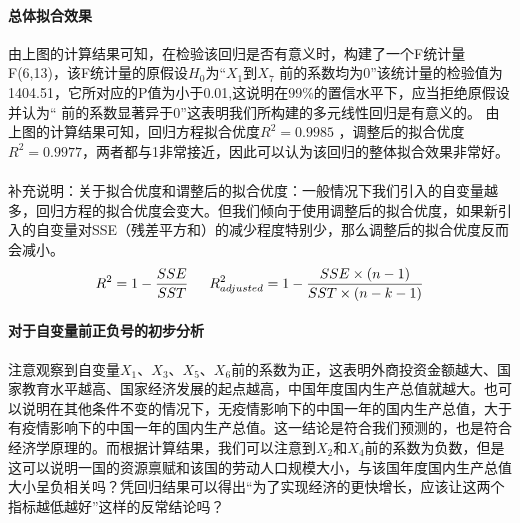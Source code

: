 \documentclass[UTF8]{article}
\begin{document}
	\paragraph{总体拟合效果}由上图的计算结果可知，在检验该回归是否有意义时，构建了一个F统计量F(6,13)，该F统计量的原假设$H_0$为“$X_1$到$X_7$ 前的系数均为0”该统计量的检验值为1404.51，它所对应的P值为小于0.01,这说明在99\%的置信水平下，应当拒绝原假设并认为“ 前的系数显著异于0”这表明我们所构建的多元线性回归是有意义的。
	由上图的计算结果可知，回归方程拟合优度$R^2=0.9985$ ，调整后的拟合优度$R^2=0.9977$，两者都与1非常接近，因此可以认为该回归的整体拟合效果非常好。
	\\
	\\补充说明：关于拟合优度和谓整后的拟合优度：一般情况下我们引入的自变量越多，回归方程的拟合优度会变大。但我们倾向于使用调整后的拟合优度，如果新引入的自变量对SSE（残差平方和）的减少程度特别少，那么调整后的拟合优度反而会减小。
	$$
	R^2=1-\frac{SSE}{SST} \indent R^2_{adjusted}=1-\frac{SSE\times(n-1)}{SST\times(n-k-1)}
	$$
	\paragraph{对于自变量前正负号的初步分析}
	注意观察到自变量$X_1$、$X_3$、$X_5$、$X_6$前的系数为正，这表明外商投资金额越大、国家教育水平越高、国家经济发展的起点越高，中国年度国内生产总值就越大。也可以说明在其他条件不变的情况下，无疫情影响下的中国一年的国内生产总值，大于有疫情影响下的中国一年的国内生产总值。这一结论是符合我们预测的，也是符合经济学原理的。而根据计算结果，我们可以注意到$X_2$和$X_4$前的系数为负数，但是这可以说明一国的资源禀赋和该国的劳动人口规模大小，与该国年度国内生产总值大小呈负相关吗？凭回归结果可以得出“为了实现经济的更快增长，应该让这两个指标越低越好”这样的反常结论吗？
\end{document}
